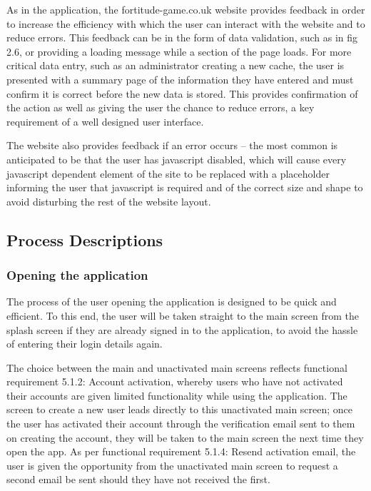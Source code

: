 As in the application, the fortitude-game.co.uk website provides feedback in order to increase the efficiency with which the user can interact with the website and to reduce errors. This feedback can be in the form of data validation, such as in fig 2.6, or providing  a loading message while a section of the page loads. For more critical data entry, such as an administrator creating a new cache, the user is presented with a summary page of the information they have entered and must confirm it is correct before the new data is stored. This provides confirmation of the action as well as giving the user the chance to reduce errors, a key requirement of a well designed user interface.

The website also provides feedback if an error occurs – the most common is anticipated to be that the user has javascript disabled, which will cause every javascript dependent element of the site to be replaced with a placeholder informing the user that javascript is required and of the correct size and shape to avoid disturbing the rest of the website layout.
\vspace{80pt}
\subsection{Process Descriptions}

\subsubsection{Opening the application}
The process of the user opening the application is designed to be quick and efficient. To this end, the user will be taken straight to the main screen from the splash screen if they are already signed in to the application, to avoid the hassle of entering their login details again.

The choice between the main and unactivated main screens reflects functional requirement 5.1.2: Account activation, whereby users who have not activated their accounts are given limited functionality while using the application. The screen to create a new user leads directly to this unactivated main screen; once the user has activated their account through the verification email sent to them on creating the account, they will be taken to the main screen the next time they open the app. As per functional requirement 5.1.4: Resend activation email, the user is given the opportunity from the unactivated main screen to request a second email be sent should they have not received the first.

